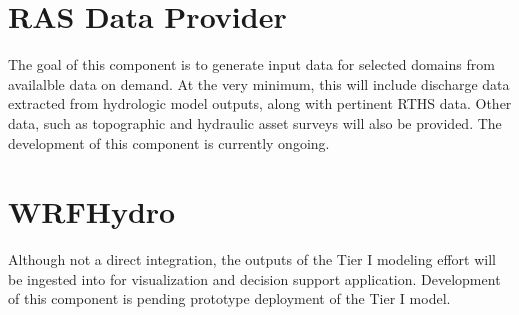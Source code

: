 \documentclass[letterpaper,12pt,english,openany,oneside]{sphinxmanual}
\begin{document}
\section{RAS Data Provider}
\label{\detokenize{euidev/integrations/index:ras-data-provider}}
\sphinxAtStartPar
The goal of this component is to generate  input data for selected domains from  availalble data on demand.  At the very minimum, this will include discharge data extracted from hydrologic model outputs, along with pertinent RTHS data. Other data, such as topographic and hydraulic asset surveys will also be provided. The development of this component is currently on\sphinxhyphen{}going.


\section{WRF\sphinxhyphen{}Hydro}
\label{\detokenize{euidev/integrations/index:wrf-hydro}}
\sphinxAtStartPar
Although not a direct integration, the outputs of the Tier I modeling effort will be ingested into  for visualization and decision support application.  Development of this component is pending prototype deployment of the Tier I model.


\renewcommand{\indexname}{Python Module Index}
\begin{sphinxtheindex}
\let\bigletter\sphinxstyleindexlettergroup
\bigletter{g}
\item\relax{}
\indexspace
\bigletter{r}
\item\relax{}
\item\relax{}
\indexspace
\bigletter{s}
\item\relax{}
\indexspace
\bigletter{w}
\item\relax{}
\end{sphinxtheindex}

\renewcommand{\indexname}{Index}
\printindex
\end{document}
